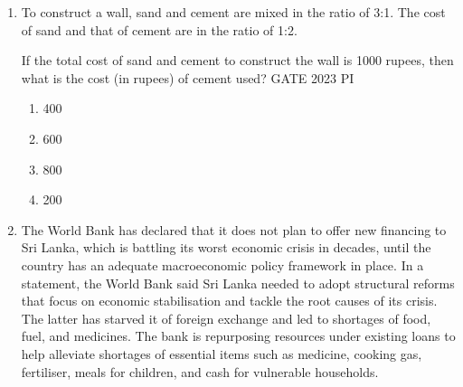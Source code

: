 \documentclass[journal,12pt,onecolumn]{IEEEtran}
\theoremstyle{remark}
\begin{document}
\begin{enumerate}
\begin{enumerate}
     \item  All human beings are cruel creatures.
     \item  Some human beings are cruel creatures.
     \item Some creatures that are cruel are human beings.
     \item No human beings are cruel creatures.
\end{enumerate}
\hfill{GATE 2023 PI}

\begin{multicols}{2}
\begin{enumerate}
    \item only a
    \item only c and d
    \item only a and b
    \item a, b and c
\end{enumerate}
\end{multicols}


\item To construct a wall, sand and cement are mixed in the ratio of 3:1. The cost of sand and that of cement are in the ratio of 1:2.

If the total cost of sand and cement to construct the wall is 1000 rupees, then what is the cost (in rupees) of cement used?
\hfill{GATE 2023 PI}

\begin{multicols}{2}
\begin{enumerate}
    \item 400
    \item 600
    \item 800
    \item 200
\end{enumerate}
\end{multicols}
\item The World Bank has declared that it does not plan to offer new financing to Sri Lanka, which is battling its worst economic crisis in decades, until the country has an adequate macroeconomic policy framework in place. In a statement, the World Bank said Sri Lanka needed to adopt structural reforms that focus on economic stabilisation and tackle the root causes of its crisis. The latter has starved it of foreign exchange and led to shortages of food, fuel, and medicines. The bank is repurposing resources under existing loans to help alleviate shortages of essential items such as medicine, cooking gas, fertiliser, meals for children, and cash for vulnerable households.


\end{enumerate}
\end{document}
